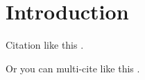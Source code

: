 %
%
\chapter{Introduction}
\label{chap:intro}
\setlength{\parskip}{1em}
%
Citation like this \cite{feynman1965feynman}. \par
%
\noindent Or you can multi-cite like this \cite{feynman1965feynman,dirac1929quantum}. \par
%

%
%

